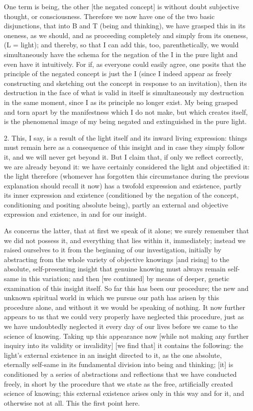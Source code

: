 One term is being, the other [the negated concept] is
without doubt subjective thought, or consciousness.
Therefore we now have one of the two basic disjunctions,
that into B and T (being and thinking),
we have grasped this in its oneness, as we should,
and as proceeding completely and simply
from its oneness, (L = light);
and thereby, so that I can add this, too, parenthetically,
we would simultaneously have the schema for the negation
of the I in the pure light and even have it intuitively.
For if, as everyone could easily agree, one posits
that the principle of the negated concept is just the I
(since I indeed appear as freely constructing and sketching out
the concept in response to an invitation),
then its destruction in the face of what is valid in itself is
simultaneously my destruction in the same moment,
since I as its principle no longer exist.
My being grasped and torn apart by the manifestness
which I do not make, but which creates itself, is
the phenomenal image of my being negated and extinguished
in the pure light.

2.  This, I say, is a result of the light itself
and its inward living expression:
things must remain here as a consequence of
this insight and in case they simply follow it,
and we will never get beyond it.
But I claim that, if only we reflect correctly,
we are already beyond it:
we have certainly considered the light
and objectified it: the light therefore
(whomever has forgotten this circumstance
during the previous explanation should recall it now)
has a twofold expression and existence,
partly its inner expression and existence
(conditioned by the negation of the concept,
conditioning and positing absolute being),
partly an external and objective expression and existence,
in and for our insight.

As concerns the latter, that at first we speak of it alone;
we surely remember that we did not possess it,
and everything that lies within it, immediately;
instead we raised ourselves to it from
the beginning of our investigation,
initially by abstracting from the whole variety
of objective knowings [and rising] to
the absolute, self-presenting insight
that genuine knowing must always
remain self-same in this variation;
and then [we continued] by means of
deeper, genetic examination of this insight itself.
So far this has been our procedure;
the new and unknown spiritual world
in which we pursue our path has arisen
by this procedure alone,
and without it we would be speaking of nothing.
It now further appears to us that
we could very properly have neglected this procedure,
just as we have undoubtedly neglected it every day
of our lives before we came to the science of knowing.
Taking up this appearance now
[while not making any further inquiry
into its validity or invalidity]
[we find that] it contains the following:
the light's external existence in an insight directed to it,
as the one absolute, eternally self-same
in its fundamental division into being and thinking;
[it] is conditioned by a series of abstractions and reflections
that we have conducted freely,
in short by the procedure that we state as
the free, artificially created science of knowing;
this external existence arises only in this way and for it,
and otherwise not at all.
This the first point here.

